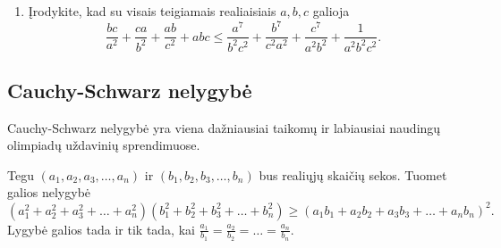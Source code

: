 \begin{enumerate}
  \item {} Įrodykite, kad su visais teigiamais
    realiaisiais $a,b,c$ galioja
    $$\frac{bc}{a^2}+\frac{ca}{b^2}+\frac{ab}{c^2}+abc\leq\frac{a^7}{b^2c^2}+\frac{b^7}{c^2a^2}+\frac{c^7}{a^2b^2}+\frac{1}{a^2b^2c^2}.$$
\end{enumerate}

\newpage
\subsection{Cauchy-Schwarz nelygybė}

Cauchy-Schwarz nelygybė yra viena dažniausiai taikomų ir labiausiai naudingų olimpiadų uždavinių sprendimuose.

\begin{thm}
  Tegu $(a_1,a_2,a_3,\ldots,a_n)$ ir $(b_1,b_2,b_3,\ldots,b_n)$ bus
  realiųjų skaičių sekos. Tuomet galios nelygybė
  $$(a_1^2+a_2^2+a_3^2+\ldots+a_n^2)(b_1^2+b_2^2+b_3^2+\ldots+b_n^2)\geq(a_1b_1+a_2b_2+a_3b_3+\ldots+a_nb_n)^2.$$
  Lygybė galios tada ir tik tada, kai
  $\frac{a_1}{b_1}=\frac{a_2}{b_2}=\ldots=\frac{a_n}{b_n}.$
\end{thm}

